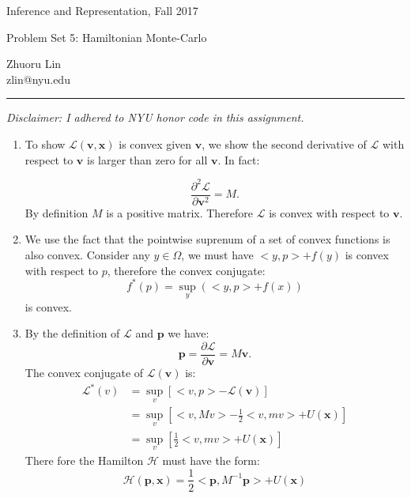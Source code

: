 \documentclass{article}
\newcommand{\ruleskip}{\bigskip\hrule\bigskip}
\begin{document}
\pagestyle{myheadings} 

{\LARGE
\begin{center}Inference and Representation, Fall 2017\end{center}
}

{\Large
Problem Set 5: Hamiltonian Monte-Carlo
}
\begin{center}
Zhuoru Lin\\
zlin@nyu.edu
\end{center}


\ruleskip 
{\em Disclaimer: 
I adhered to NYU honor code in this assignment. }
\begin{enumerate}
\item 
To show $\mathcal{L}(\textbf{v}, \textbf{x})$ is convex given $\textbf{v}$, we show the second derivative of $\mathcal{L}$ with respect to $\textbf{v}$ is larger than zero for all $\textbf{v}$. In fact:

\begin{equation}
\frac{\partial^2\mathcal{L}}{\partial\mathbf{v}^2} = M.
\end{equation}
By definition $M$ is a positive matrix. Therefore $\mathcal{L}$ is convex with respect to $\textbf{v}$.
\pagebreak
\item 
We use the fact that the pointwise suprenum of a set of convex functions is also convex. Consider any $y \in \Omega$, we must have $<y, p>+ f(y)$ is convex with respect to $p$, therefore the convex conjugate:
\begin{equation}
f^{*}(p) = \sup_{y}(<y, p>+f(x))
\end{equation}
\pagebreak
is convex.
\item 
By the definition of $\mathcal{L}$ and $\textbf{p}$ we have:
\begin{equation}\label{def_p}
\textbf{p} = \frac{\partial \mathcal{L}}{\partial \textbf{v}} = M \textbf{v}.
\end{equation}
The convex conjugate of $\mathcal{L}(\textbf{v})$ is:
\begin{align*}
\mathcal{L}^{*} (v) &= \sup_{v} [<v, p> - \mathcal{L}(\mathbf{v})]\\
&= \sup_{v}[<v, Mv> - \frac{1}{2} <v, mv> + U(\textbf{x})]\\
&= \sup_{v} [ \frac{1}{2} <v, mv> + U(\textbf{x}) ]
\end{align*}
There fore the Hamilton $\mathcal{H}$ must have the form:
\begin{equation}\label{def_H}
\mathcal{H}(\textbf{p}, \textbf{x}) = \frac{1}{2} <\textbf{p}, M^{-1} \textbf{p}> + U(\textbf{x})
\end{equation}
\pagebreak


\end{enumerate}
\end{document}
